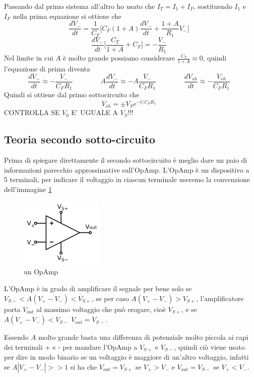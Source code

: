 \documentclass{article}
\begin{document}
			Passando dal primo sistema all'altro ho usato che $I_T=I_1+I_F$, sostituendo $I_1$ e $I_F$ nella prima equazione si ottiene che
			\[
				\frac{dV_-}{dt}=\frac{1}{C_T}\bigg[C_F(1+A)\frac{dV_-}{dt}+\frac{1+A}{R_1}V_-\bigg]
			\]
			\[
				\frac{dV_-}{dt}\bigg[\frac{C_T}{1+A}+C_F\bigg]=-\frac{V_-}{R_1}
			\]
			Nel limite in cui $A$ è molto grande possiamo considerare $\frac{C_T}{1+A}\approx0$, quindi l'equazione di prima diventa
			\[
				\frac{dV_-}{dt}\approx-\frac{V_-}{C_FR_1}\qquad\qquad
				A\frac{dV_-}{dt}\approx-A\frac{V_-}{C_FR_1}\qquad\qquad
				\frac{dV_{sh}}{dt}\approx-\frac{V_{sh}}{C_FR_1}
			\]
			Quindi si ottiene dal primo sottocircuito che\newline
			\begin{equation}
				V_{sh}=\pm V_Se^{-t/C_FR_1}
			\end{equation}
			CONTROLLA SE $V_0$ E' UGUALE A $V_S$!!!
		\subsection{Teoria secondo sotto-circuito}
			Prima di spiegare direttamente il secondo sottocircuito è meglio dare un paio di informazioni parecchio approssimative sull'OpAmp.\newline
			L'OpAmp è un dispositivo a 5 terminali, per indicare il voltaggio in ciascun terminale useremo la convenzione dell'immagine \ref{fig:OpAmp1}\newline
			\begin{figure}
				\label{fig:OpAmp1}
				\centering
				\includegraphics[width=40mm]{immagini/OpAmp1.png}
				\caption{un OpAmp}
			\end{figure}
			L'OpAmp è in grado di amplificare il segnale per bene solo se $V_{S-}<A(V_+-V_-)<V_{S+}$, se per caso $A(V_+-V_-)>V_{S+}$, l'amplificatore porta $V_{out}$ al massimo voltaggio che può erogare, cioè $V_{S+}$, e se $A(V_+-V_-)<V_{S-}$ $V_{out}=V_{S-}$.\newline

			Essendo $A$ molto grande basta una differenza di potenziale molto piccola ai capi dei terminali + e - per mandare l'OpAmp a $V_{S+}$ e $V_{S-}$, quindi ciò viene usato per dire in modo binario se un voltaggio è maggiore di un'altro voltaggio, infatti se $A|V_+-V_-|>>1$ si ha che $V_{out}=V_{S+}$ se $V_+>V_-$ e $V_{out}=V_{S-}$ se $V_+<V_-$.\newline
\end{document}
